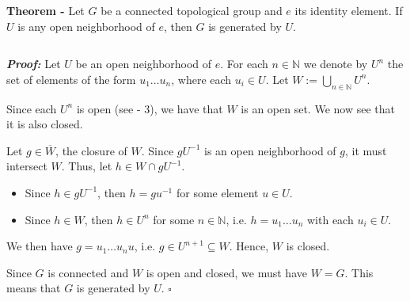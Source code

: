 \documentclass[12pt]{article}
\begin{document}
{\bf Theorem -} Let $G$ be a connected topological group and $e$ its identity element. If $U$ is any open neighborhood of $e$, then $G$ is generated by $U$.

$\,$

{\bf \emph{Proof:}} Let $U$ be an open neighborhood of $e$. For each $n \in \mathbb{N}$ we denote by $U^n$ the set of elements of the form $u_1 \dots u_n$, where each $u_i \in U$. Let $W := \bigcup_{n \in \mathbb{N}} U^n$.

Since each $U^n$ is open (see  -  3), we have that $W$ is an open set. We now see that it is also closed.

Let $g \in \overline{W}$, the closure of $W$. Since $gU^{-1}$ is an open neighborhood of $g$, it must intersect $W$. Thus, let $h \in W \cap gU^{-1}$.
\begin{itemize}
\item Since $h \in gU^{-1}$, then $h = gu^{-1}$ for some element $u \in U$.
\item Since $h \in W$, then $h \in U^n$ for some $n \in \mathbb{N}$, i.e. $h=u_1 \dots u_n$ with each $u_i \in U$.
\end{itemize}
We then have $g= u_1 \dots u_n u$, i.e. $g \in U^{n+1} \subseteq W$. Hence, $W$ is closed.

Since $G$ is connected and $W$ is open and closed, we must have $W = G$. This means that $G$ is generated by $U$. $\square$
\end{document}
